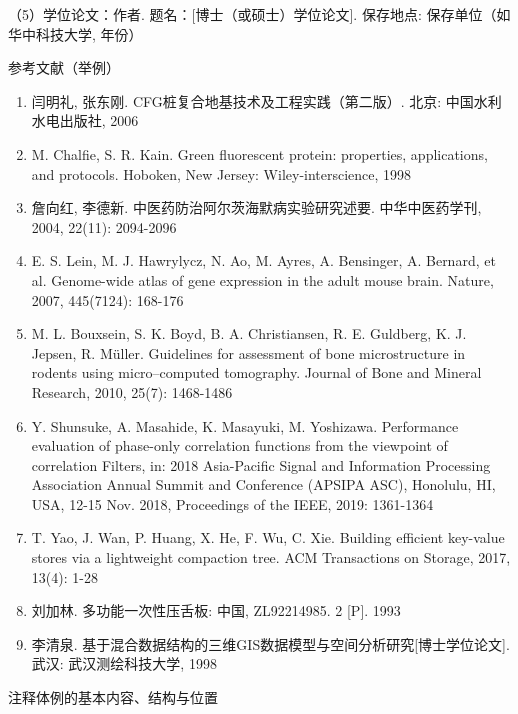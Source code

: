 （5）学位论文：作者. 题名：[博士（或硕士）学位论文]. 保存地点: 保存单位（如华中科技大学, 年份）

参考文献（举例）
\begin{enumerate}
\renewcommand{\labelenumi}{[\theenumi]}
\item	闫明礼, 张东刚. CFG桩复合地基技术及工程实践（第二版）. 北京: 中国水利水电出版社, 2006

\item	M. Chalfie, S. R. Kain. Green fluorescent protein: properties, applications, and protocols. Hoboken, New Jersey: Wiley-interscience, 1998

\item	詹向红, 李德新. 中医药防治阿尔茨海默病实验研究述要. 中华中医药学刊, 2004, 22(11): 2094-2096

\item	E. S. Lein, M. J. Hawrylycz, N. Ao, M. Ayres, A. Bensinger, A. Bernard, et al. Genome-wide atlas of gene expression in the adult mouse brain. Nature, 2007, 445(7124): 168-176

\item	M. L. Bouxsein, S. K. Boyd, B. A. Christiansen, R. E. Guldberg, K. J. Jepsen, R. Müller. Guidelines for assessment of bone microstructure in rodents using micro–computed tomography. Journal of Bone and Mineral Research, 2010, 25(7): 1468-1486

\item	Y. Shunsuke, A. Masahide, K. Masayuki, M. Yoshizawa. Performance evaluation of phase-only correlation functions from the viewpoint of correlation Filters, in: 2018 Asia-Pacific Signal and Information Processing Association Annual Summit and Conference (APSIPA ASC), Honolulu, HI, USA, 12-15 Nov. 2018, Proceedings of the IEEE, 2019: 1361-1364

\item	T. Yao, J. Wan, P. Huang, X. He, F. Wu, C. Xie. Building efficient key-value stores via a lightweight compaction tree. ACM Transactions on Storage, 2017, 13(4): 1-28

\item	刘加林. 多功能一次性压舌板: 中国, ZL92214985. 2 [P]. 1993

\item	李清泉. 基于混合数据结构的三维GIS数据模型与空间分析研究[博士学位论文]. 武汉: 武汉测绘科技大学, 1998

\end{enumerate}

注释体例的基本内容、结构与位置

